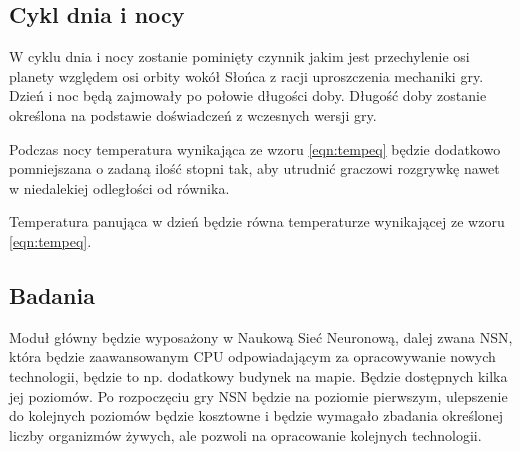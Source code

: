 \documentclass[a4paper,12pt]{article}
\begin{document}
\subsection{Cykl dnia i nocy}
W cyklu dnia i nocy zostanie pominięty czynnik jakim jest przechylenie osi planety względem osi orbity wokół Słońca z racji uproszczenia mechaniki gry. Dzień i noc będą zajmowały po połowie długości doby. Długość doby zostanie określona na podstawie doświadczeń z wczesnych wersji gry.

Podczas nocy temperatura wynikająca ze wzoru \ref{eqn:tempeq} będzie dodatkowo pomniejszana o zadaną ilość stopni tak, aby utrudnić graczowi rozgrywkę nawet w niedalekiej odległości od równika.

Temperatura panująca w dzień będzie równa temperaturze wynikającej ze wzoru \ref{eqn:tempeq}.
\subsection{Badania}
\label{section:research}
Moduł główny będzie wyposażony w Naukową Sieć Neuronową, dalej zwana NSN, która będzie zaawansowanym CPU odpowiadającym za opracowywanie nowych technologii, będzie to np. dodatkowy budynek na mapie. Będzie dostępnych kilka jej poziomów. Po rozpoczęciu gry NSN będzie na poziomie pierwszym, ulepszenie do kolejnych poziomów będzie kosztowne i będzie wymagało zbadania określonej liczby organizmów żywych, ale pozwoli na opracowanie kolejnych technologii.
\end{document}

